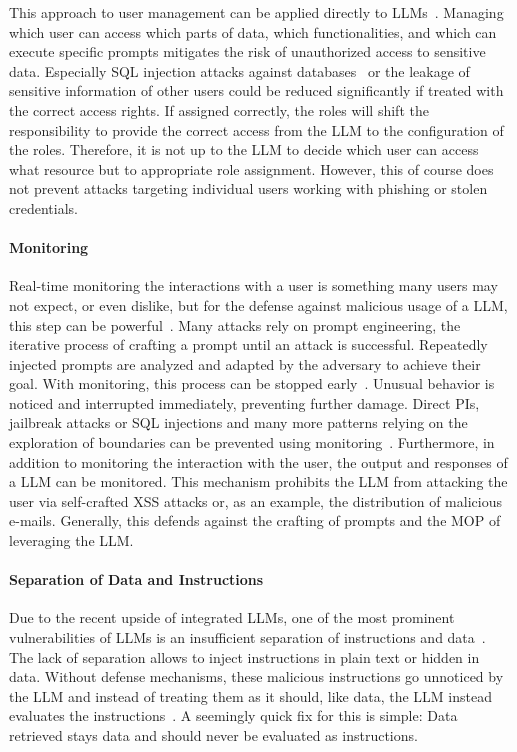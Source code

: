 This approach to user management can be applied directly to LLMs~\cite{zafar2023building}.
Managing which user can access which parts of data, which functionalities, and which can execute specific prompts mitigates the risk of unauthorized access to sensitive data.
Especially SQL injection attacks against databases~\cite{pedro2023prompt} or the leakage of sensitive information of other users could be reduced significantly if treated with the correct access rights. 
If assigned correctly, the roles will shift the responsibility to provide the correct access from the LLM to the configuration of the roles.
Therefore, it is not up to the LLM to decide which user can access what resource but to appropriate role assignment. 
However, this of course does not prevent attacks targeting individual users working with phishing or stolen credentials.

\paragraph{Monitoring}
Real-time monitoring the interactions with a user is something many users may not expect, or even dislike, but for the defense against malicious usage of a LLM, this step can be powerful~\cite{Monitoring}.
Many attacks rely on prompt engineering, the iterative process of crafting a prompt until an attack is successful.
Repeatedly injected prompts are analyzed and adapted by the adversary to achieve their goal.
With monitoring, this process can be stopped early~\cite{Monitoring}. 
Unusual behavior is noticed and interrupted immediately, preventing further damage. 
Direct PIs, jailbreak attacks or SQL injections and many more patterns relying on the exploration of boundaries can be prevented using monitoring~\cite{Monitoring_blog}.
Furthermore, in addition to monitoring the interaction with the user, the output and responses of a LLM can be monitored. 
This mechanism prohibits the LLM from attacking the user via self-crafted XSS attacks or, as an example, the distribution of malicious e-mails. Generally, this defends against the crafting of prompts and the MOP of leveraging the LLM.

\paragraph{Separation of Data and Instructions}
Due to the recent upside of integrated LLMs, one of the most prominent vulnerabilities of LLMs is an insufficient separation of instructions and data~\cite{10.1145/3605764.3623985}. 
The lack of separation allows to inject instructions in plain text or hidden in data.
Without defense mechanisms, these malicious instructions go unnoticed by the LLM and instead of treating them as it should, like data, the LLM instead evaluates the instructions~\cite{10.1145/3605764.3623985}.
A seemingly quick fix for this is simple: Data retrieved stays data and should never be evaluated as instructions.

